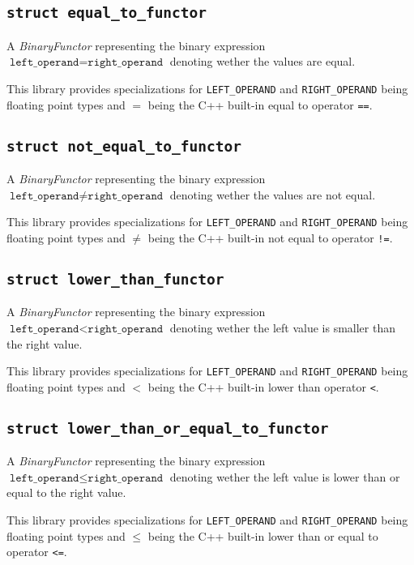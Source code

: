 \documentclass[oneside]{book}
\begin{document}
\subsection{\texttt{struct equal\_to\_functor}}
A \textit{BinaryFunctor} representing the binary expression
$\texttt{left\_operand} = \texttt{right\_operand}$
denoting wether the values are equal.\newline

\noindent{}This library provides specializations for \texttt{LEFT\_OPERAND} and \texttt{RIGHT\_OPERAND} being floating point types
and $=$ being the C++ built-in equal to operator \texttt{==}.

\subsection{\texttt{struct not\_equal\_to\_functor}}
A \textit{BinaryFunctor} representing the binary expression
$\texttt{left\_operand} \neq \texttt{right\_operand}$
denoting wether the values are not equal.\newline

\noindent{}This library provides specializations for \texttt{LEFT\_OPERAND} and \texttt{RIGHT\_OPERAND} being floating point types
and $\neq$ being the C++ built-in not equal to operator \texttt{!=}.

\subsection{\texttt{struct lower\_than\_functor}}
A \textit{BinaryFunctor} representing the binary expression
$\texttt{left\_operand} < \texttt{right\_operand}$
denoting wether the left value is smaller than the right value.\newline

\noindent{}This library provides specializations for \texttt{LEFT\_OPERAND} and \texttt{RIGHT\_OPERAND} being floating point types
and $<$ being the C++ built-in lower than operator \texttt{<}.

\subsection{\texttt{struct lower\_than\_or\_equal\_to\_functor}}
A \textit{BinaryFunctor} representing the binary expression
$\texttt{left\_operand} \leq \texttt{right\_operand}$
denoting wether the left value is lower than or equal to the right value.\newline

\noindent{}This library provides specializations for \texttt{LEFT\_OPERAND} and \texttt{RIGHT\_OPERAND} being floating point types
and $\leq$ being the C++ built-in lower than or equal to operator \texttt{<=}.
\end{document}
